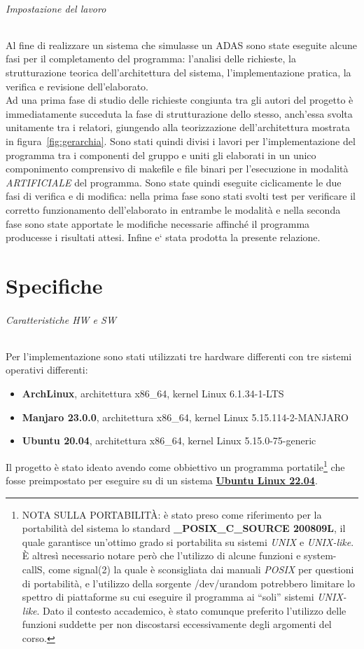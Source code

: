 \documentclass[11pt, openany]{article}
\theoremstyle{definition}
\theoremstyle{plain}
\theoremstyle{remark}
\begin{document}
		\paragraph{Impostazione del lavoro}
			Al fine di realizzare un sistema che simulasse un ADAS sono state eseguite alcune fasi per il completamento del programma: l'analisi delle richieste, la strutturazione teorica dell'architettura del sistema, l'implementazione pratica, la verifica e revisione dell'elaborato.\\
			Ad una prima fase di studio delle richieste congiunta tra gli autori del progetto è immediatamente succeduta la fase di strutturazione dello stesso, anch'essa svolta unitamente tra i relatori, giungendo alla teorizzazione dell'architettura mostrata in figura~\ref{fig:gerarchia}. Sono stati quindi divisi i lavori per l'implementazione del programma tra i componenti del gruppo e uniti gli elaborati in un unico componimento comprensivo di makefile e file binari per l'esecuzione in modalità \textit{ARTIFICIALE} del programma. Sono state quindi eseguite ciclicamente le due fasi di verifica e di modifica: nella prima fase sono stati svolti test per verificare il corretto funzionamento dell'elaborato in entrambe le modalità e nella seconda fase sono state apportate le modifiche necessarie affinché il programma producesse i risultati attesi. Infine e` stata prodotta la presente relazione.
	\part{Specifiche}
		\paragraph{Caratteristiche HW e SW}
		Per l'implementazione sono stati utilizzati tre hardware differenti con tre sistemi operativi differenti:
		\begin{itemize}
			\item \textbf{ArchLinux}, architettura x86\_64, kernel Linux 6.1.34-1-LTS
			\item \textbf{Manjaro 23.0.0}, architettura x86\_64, kernel Linux 5.15.114-2-MANJARO
			\item \textbf{Ubuntu 20.04}, architettura x86\_64, kernel Linux 5.15.0-75-generic
		\end{itemize}
		Il progetto è stato ideato avendo come obbiettivo un programma portatile\footnote{NOTA SULLA PORTABILITÀ: è stato preso come riferimento per la portabilità del sistema lo standard \textbf{\_POSIX\_C\_SOURCE 200809L}, il quale garantisce un'ottimo grado si portabilita su sistemi \textit{UNIX} e \textit{UNIX-like}. È altresì necessario notare però che l'utilizzo di alcune funzioni e system-callS, come signal(2) la quale è sconsigliata dai manuali \textit{POSIX} per questioni di portabilità, e l'utilizzo della sorgente /dev/urandom potrebbero limitare lo spettro di piattaforme  su cui eseguire il programma ai ``soli'' sistemi \textit{UNIX-like}. Dato il contesto accademico, è stato comunque preferito l'utilizzo delle funzioni suddette per non discostarsi eccessivamente degli argomenti del corso.} che fosse preimpostato per eseguire su di un sistema \textbf{\underline{Ubuntu Linux 22.04}}.
\end{document}

